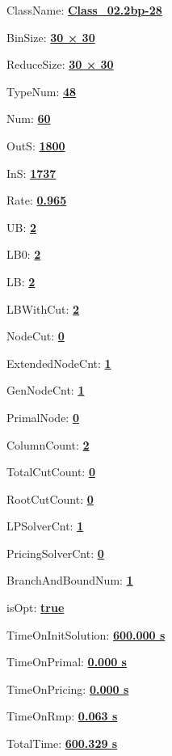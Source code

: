 \documentclass[11pt]{article}
\begin{document}
\pagestyle{empty}


ClassName: \underline{\textbf{Class_02.2bp-28}}
\par
BinSize: \underline{\textbf{30 × 30}}
\par
ReduceSize: \underline{\textbf{30 × 30}}
\par
TypeNum: \underline{\textbf{48}}
\par
Num: \underline{\textbf{60}}
\par
OutS: \underline{\textbf{1800}}
\par
InS: \underline{\textbf{1737}}
\par
Rate: \underline{\textbf{0.965}}
\par
UB: \underline{\textbf{2}}
\par
LB0: \underline{\textbf{2}}
\par
LB: \underline{\textbf{2}}
\par
LBWithCut: \underline{\textbf{2}}
\par
NodeCut: \underline{\textbf{0}}
\par
ExtendedNodeCnt: \underline{\textbf{1}}
\par
GenNodeCnt: \underline{\textbf{1}}
\par
PrimalNode: \underline{\textbf{0}}
\par
ColumnCount: \underline{\textbf{2}}
\par
TotalCutCount: \underline{\textbf{0}}
\par
RootCutCount: \underline{\textbf{0}}
\par
LPSolverCnt: \underline{\textbf{1}}
\par
PricingSolverCnt: \underline{\textbf{0}}
\par
BranchAndBoundNum: \underline{\textbf{1}}
\par
isOpt: \underline{\textbf{true}}
\par
TimeOnInitSolution: \underline{\textbf{600.000 s}}
\par
TimeOnPrimal: \underline{\textbf{0.000 s}}
\par
TimeOnPricing: \underline{\textbf{0.000 s}}
\par
TimeOnRmp: \underline{\textbf{0.063 s}}
\par
TotalTime: \underline{\textbf{600.329 s}}
\par
\newpage
\end{document}
